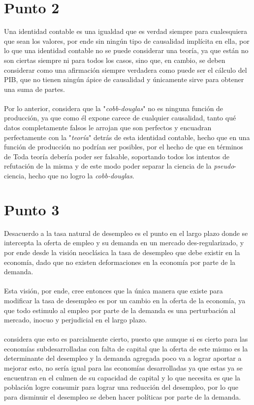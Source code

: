 \documentclass[11pt]{article}
\begin{document}
{\section{Punto 2}
\begin{flushleft}
    Una identidad contable es una igualdad que es verdad siempre para cualesquiera que sean los valores, por ende sin ningún tipo de causalidad implícita en ella, 
    por lo que una identidad contable no se puede considerar una teoría, ya que están no son ciertas siempre ni para todos los casos, sino que, en cambio, se deben considerar como una afirmación siempre verdadera 
    como puede ser el cálculo del PIB, que no tienen ningún ápice de causalidad y únicamente sirve para obtener una suma de partes.
    \\~\\
    Por lo anterior, \citet{shaikh_1974} considera que la "\textit{cobb-douglas}" no es ninguna función de producción, ya que como él expone carece de cualquier causalidad, tanto qué datos completamente 
    falsos le arrojan que son perfectos y encuadran perfectamente con la "\textit{teoría}" detrás de esta identidad contable, hecho que en una función de producción no podrían ser posibles, por el hecho de que en términos de \citet{popper_1959}
    Toda teoría debería poder ser falsable, soportando todos los intentos de refutación de la misma y de este modo poder separar la ciencia de la \textit{pseudo}-ciencia, hecho que no logro la \textit{cobb-douglas}.
\end{flushleft}

\section{Punto 3}
\begin{flushleft}
    Desacuerdo a \citet{friedman_1968} la tasa natural de desempleo es el punto en el largo plazo donde se intercepta la oferta de empleo
    y su demanda en un mercado des-regularizado, y por ende desde la visión neoclásica la tasa de desempleo que debe existir en la economía, dado que no 
    existen deformaciones en la economía por parte de la demanda.
    \\~\\
    Esta visión, por ende, cree entonces que la única manera que existe para modificar la tasa de desempleo es por un cambio en la oferta de la economía, 
    ya que todo estimulo al empleo por parte de la demanda es una perturbación al mercado, inocuo y perjudicial en el largo plazo.
    \\~\\
    \citet{kalecki_1980} considera que esto es parcialmente cierto, puesto que aunque si es cierto para las economías subdesarrolladas con falta de capital 
    que la oferta de este mismo es la determinante del desempleo y la demanda agregada poco va a lograr aportar a mejorar esto, no sería igual para las economías
    desarrolladas ya que estas ya se encuentran en el culmen de su capacidad de capital y lo que necesita es que la población logre consumir para lograr una reducción del desempleo,
    por lo que para disminuir el desempleo se deben hacer políticas por parte de la demanda.
\end{flushleft}

}
\end{document}

